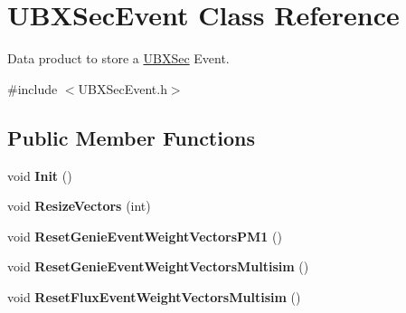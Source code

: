 \hypertarget{classUBXSecEvent}{\section{U\-B\-X\-Sec\-Event Class Reference}
\label{classUBXSecEvent}
}


Data product to store a \hyperlink{classUBXSec}{U\-B\-X\-Sec} Event.  




{\ttfamily \#include $<$U\-B\-X\-Sec\-Event.\-h$>$}

\subsection*{Public Member Functions}
\begin{DoxyCompactItemize}
\item 
\hypertarget{classUBXSecEvent_a57603c847176b408838d04e690b04828}{void {\bfseries Init} ()}\label{classUBXSecEvent_a57603c847176b408838d04e690b04828}

\item 
\hypertarget{classUBXSecEvent_a87228eb442b415053b9a9a070d29790b}{void {\bfseries Resize\-Vectors} (int)}\label{classUBXSecEvent_a87228eb442b415053b9a9a070d29790b}

\item 
\hypertarget{classUBXSecEvent_a6b37b5a9d26a367edbe0a8fc0a69c103}{void {\bfseries Reset\-Genie\-Event\-Weight\-Vectors\-P\-M1} ()}\label{classUBXSecEvent_a6b37b5a9d26a367edbe0a8fc0a69c103}

\item 
\hypertarget{classUBXSecEvent_a95f1ed351bf03ff7cd59106d9af67548}{void {\bfseries Reset\-Genie\-Event\-Weight\-Vectors\-Multisim} ()}\label{classUBXSecEvent_a95f1ed351bf03ff7cd59106d9af67548}

\item 
\hypertarget{classUBXSecEvent_a4544b8b5f596e1fd314476ddc240ad56}{void {\bfseries Reset\-Flux\-Event\-Weight\-Vectors\-Multisim} ()}\label{classUBXSecEvent_a4544b8b5f596e1fd314476ddc240ad56}

\end{DoxyCompactItemize}
